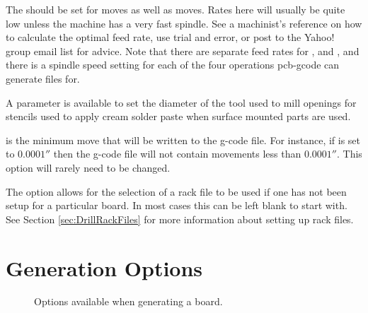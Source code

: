\documentclass[11pt]{book}
\begin{document}
The  should be set for  moves as well as  moves. Rates here will usually be quite low unless the machine has a very fast spindle. See a machinist's reference on how to calculate the optimal feed rate, use trial and error, or post to the Yahoo! group email list for advice. Note that there are separate feed rates for , and , and there is a spindle speed setting for each of the four operations pcb-gcode can generate files for.

A  parameter is available to set the diameter of the tool used to mill openings for stencils used to apply cream solder paste when surface mounted parts are used.

 is the minimum move that will be written to the g-code file. For instance, if  is set to $0.0001''$ then the g-code file will not contain movements less than $0.0001''$. This option will rarely need to be changed.

The  option allows for the selection of a rack file to be used if one has not been setup for a particular board. In most cases this can be left blank to start with. See Section \vref{sec:DrillRackFiles} for more information about setting up rack files. 

%
%
\section{Generation Options}\label{sec:GenerationOptions}

\begin{figure}
	\caption{Options available when generating a board.}
	\label{fig:SetupGenerationOptions}
\end{figure}
\end{document}
